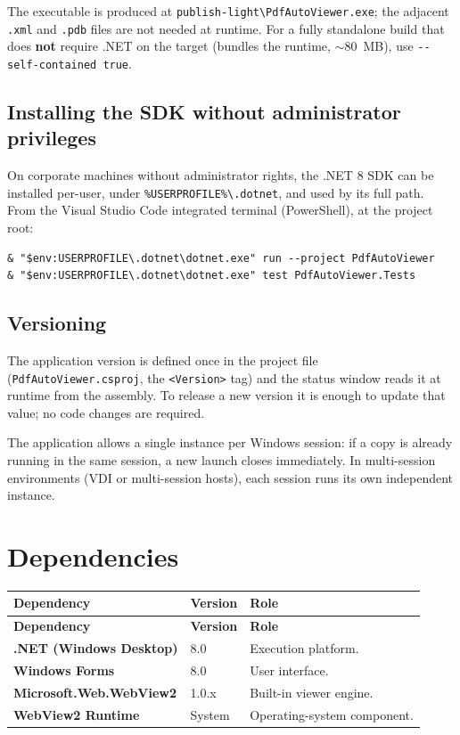 \documentclass[11pt,a4paper]{article}
\newcommand{\bs}{\textbackslash\allowbreak}
\newcommand{\ruta}[1]{\texttt{\small #1}}
\begin{document}
The executable is produced at \ruta{publish-light\bs PdfAutoViewer.exe}; the
adjacent \texttt{.xml} and \texttt{.pdb} files are not needed at runtime. For a
fully standalone build that does \textbf{not} require .NET on the target (bundles
the runtime, $\sim$80~MB), use \texttt{-{}-self-contained true}.

\subsection{Installing the SDK without administrator privileges}
On corporate machines without administrator rights, the .NET 8 SDK can be
installed per-user, under \ruta{\%USERPROFILE\%\bs.dotnet}, and used by its full
path. From the Visual Studio Code integrated terminal (PowerShell), at the project
root:

\begin{lstlisting}[caption={Running with a local SDK (no administrator).}]
& "$env:USERPROFILE\.dotnet\dotnet.exe" run --project PdfAutoViewer
& "$env:USERPROFILE\.dotnet\dotnet.exe" test PdfAutoViewer.Tests
\end{lstlisting}

\subsection{Versioning}
The application version is defined once in the project file
(\texttt{PdfAutoViewer.csproj}, the \texttt{<Version>} tag) and the status window
reads it at runtime from the assembly. To release a new version it is enough to
update that value; no code changes are required.

The application allows a single instance per Windows session: if a copy is already
running in the same session, a new launch closes immediately. In multi-session
environments (VDI or multi-session hosts), each session runs its own independent
instance.

\section{Dependencies}
\begin{xltabular}{\textwidth}{@{} >{\bfseries}p{5.2cm} p{2.4cm} L @{}}
\toprule
\normalfont\textbf{Dependency} & \textbf{Version} & \textbf{Role} \\
\midrule
\endfirsthead
\toprule
\normalfont\textbf{Dependency} & \textbf{Version} & \textbf{Role} \\
\midrule
\endhead
\bottomrule
\endfoot
.NET (Windows Desktop) & 8.0 & Execution platform. \\
Windows Forms & 8.0 & User interface. \\
Microsoft.Web.WebView2 & 1.0.x & Built-in viewer engine. \\
WebView2 Runtime & System & Operating-system component. \\
\bottomrule
\end{xltabular}
\end{document}
